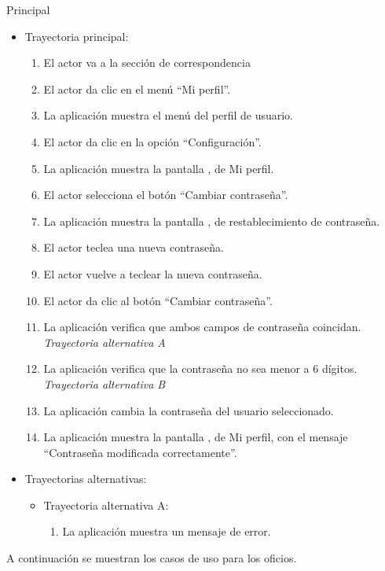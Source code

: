 \begin{UCtrayectoria}{Principal}
			\begin{itemize}
				\item Trayectoria principal:
					\begin{enumerate}
						\item El actor va a la sección de correspondencia 
						\item El actor da clic en el menú ``Mi perfil''.
						\item La aplicación muestra el menú del perfil de usuario.
						\item El actor da clic en la opción ``Configuración''.
						\item La aplicación muestra la pantalla , de Mi perfil.
						\item El actor selecciona el botón ``Cambiar contraseña''.
						\item La aplicación muestra la pantalla , de restablecimiento de contraseña.
						\item El actor teclea una nueva contraseña.
						\item El actor vuelve a teclear la nueva contraseña.
						\item El actor da clic al botón ``Cambiar contraseña''.
						\item La aplicación verifica que ambos campos de contraseña coincidan. \textsl{Trayectoria alternativa A}
						\item La aplicación verifica que la contraseña no sea menor a 6 dígitos. \textsl{Trayectoria alternativa B}
						\item La aplicación cambia la contraseña del usuario seleccionado.
						\item La aplicación muestra la pantalla , de Mi perfil, con el mensaje ``Contraseña modificada correctamente''.
					\end{enumerate}
				\item Trayectorias alternativas:
					\begin{itemize}
						\item Trayectoria alternativa A:
							\begin{enumerate}
								\item La aplicación muestra un mensaje de error.
							\end{enumerate}
					\end{itemize}
			\end{itemize}


A continuación se muestran los casos de uso para los oficios.

\newpage


\end{UCtrayectoria}
